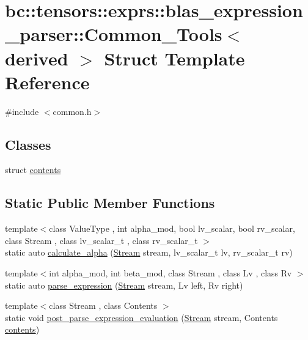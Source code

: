 \hypertarget{structbc_1_1tensors_1_1exprs_1_1blas__expression__parser_1_1Common__Tools}{}\section{bc\+:\+:tensors\+:\+:exprs\+:\+:blas\+\_\+expression\+\_\+parser\+:\+:Common\+\_\+\+Tools$<$ derived $>$ Struct Template Reference}
\label{structbc_1_1tensors_1_1exprs_1_1blas__expression__parser_1_1Common__Tools}


{\ttfamily \#include $<$common.\+h$>$}

\subsection*{Classes}
\begin{DoxyCompactItemize}
\item 
struct \hyperlink{structbc_1_1tensors_1_1exprs_1_1blas__expression__parser_1_1Common__Tools_1_1contents}{contents}
\end{DoxyCompactItemize}
\subsection*{Static Public Member Functions}
\begin{DoxyCompactItemize}
\item 
{\footnotesize template$<$class Value\+Type , int alpha\+\_\+mod, bool lv\+\_\+scalar, bool rv\+\_\+scalar, class Stream , class lv\+\_\+scalar\+\_\+t , class rv\+\_\+scalar\+\_\+t $>$ }\\static auto \hyperlink{structbc_1_1tensors_1_1exprs_1_1blas__expression__parser_1_1Common__Tools_a72c9b6ac05d3885bbfb394b4222e2319}{calculate\+\_\+alpha} (\hyperlink{classbc_1_1streams_1_1Stream}{Stream} stream, lv\+\_\+scalar\+\_\+t lv, rv\+\_\+scalar\+\_\+t rv)
\item 
{\footnotesize template$<$int alpha\+\_\+mod, int beta\+\_\+mod, class Stream , class Lv , class Rv $>$ }\\static auto \hyperlink{structbc_1_1tensors_1_1exprs_1_1blas__expression__parser_1_1Common__Tools_ace5f107f3c541ccecad89f19a6035660}{parse\+\_\+expression} (\hyperlink{classbc_1_1streams_1_1Stream}{Stream} stream, Lv left, Rv right)
\item 
{\footnotesize template$<$class Stream , class Contents $>$ }\\static void \hyperlink{structbc_1_1tensors_1_1exprs_1_1blas__expression__parser_1_1Common__Tools_a1656ea49b54cbd6eae7f418093c7892a}{post\+\_\+parse\+\_\+expression\+\_\+evaluation} (\hyperlink{classbc_1_1streams_1_1Stream}{Stream} stream, Contents \hyperlink{structbc_1_1tensors_1_1exprs_1_1blas__expression__parser_1_1Common__Tools_1_1contents}{contents})
\end{DoxyCompactItemize}


